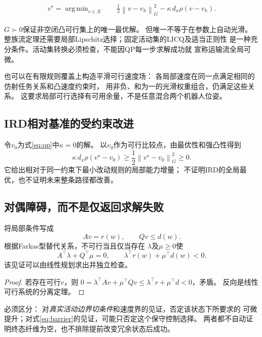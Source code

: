 \documentclass[UTF8,11pt,a4paper,fontset=fandol]{ctexart}
\numberwithin{equation}{section}
\theoremstyle{definition}
\newcommand{\norm}[1]{\left\lVert#1\right\rVert}
\DeclareMathOperator{\argmin}{arg\,min}
\begin{document}
\begin{equation}
 \boxed{
 \begin{aligned}
 v^\star=\argmin_{v\in\mathcal K}\quad&
 \frac12\norm{v-v_h}_G^2
 -\kappa\,d_x\rho(v-v_h).
 \end{aligned}
 }
 \label{eq:qp}
\end{equation}

$G\succ0$保证非空闭凸可行集上的唯一最优解。
但唯一不等于在参数上自动光滑。
整族流定理还需要局部Lipschitz选择；固定活动集的LICQ及适当正则性
是一种充分条件。活动集转换必须检查，不能因QP每一步求解成功就
宣称运输流全局可微。

也可以在有限规则覆盖上构造平滑可行速度场：
各局部速度在同一点满足相同的仿射任务关系和凸速度约束时，
用非负、和为一的光滑权重组合，仍满足这些关系。
这要求局部可行选择有可用余量，不是任意混合两个机器人位姿。

\subsection{IRD相对基准的受约束改进}

令$v_0$为式\eqref{eq:qp}中$\kappa=0$的解。
以$v_0$作为可行比较点，由最优性和强凸性得到
\begin{equation}
 \kappa\,d_x\rho(v^\star-v_0)
 \geq \frac12\norm{v^\star-v_0}_G^2\geq0.
\end{equation}
它给出相对于同一约束下最小改动规则的局部能力增量；
不证明IRD的全局最优，也不证明未来整条路径都改善。

\subsection{对偶障碍，而不是仅返回求解失败}

将局部条件写成
\begin{equation}
 Av=r(w),\qquad Qv\leq d(w).
\end{equation}
根据Farkas型替代关系，不可行当且仅当存在
$\lambda$及$\mu\geq0$使
\begin{equation}
 \boxed{
 A^\top\lambda+Q^\top\mu=0,\qquad
 \lambda^\top r(w)+\mu^\top d(w)<0.
 }
 \label{eq:dual}
\end{equation}
该见证可以由线性规划求出并独立检查。

\begin{proof}
若存在可行$v$，则
$0=\lambda^\top Av+\mu^\top Qv
\leq\lambda^\top r+\mu^\top d<0$，矛盾。
反向是线性可行系统的分离定理。
\end{proof}

必须区分：
对\emph{真实活动边界切条件}和速度界的见证，否定该状态下所要求的
可微提升；对式\eqref{eq:barrier}的见证，可能只否定这个保守控制选择。
两者都不自动证明终态纤维为空，也不排除提前改变冗余状态后成功。
\end{document}
